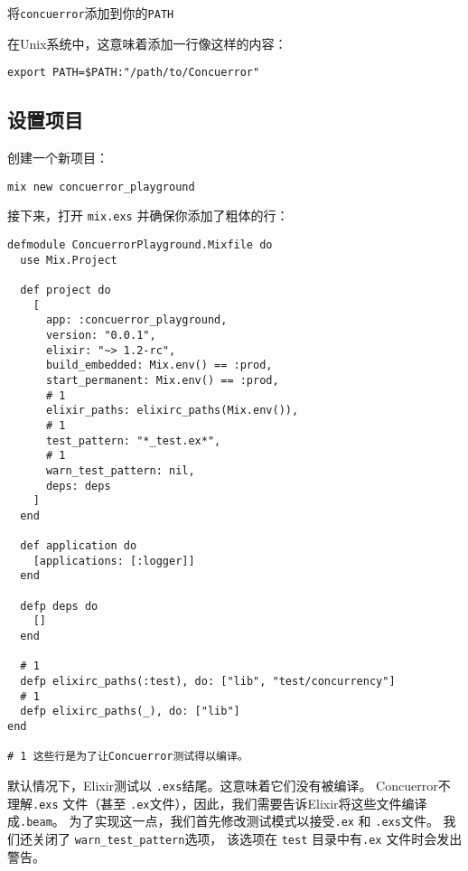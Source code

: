 将\texttt{concuerror}添加到你的\texttt{PATH}

在Unix系统中，这意味着添加一行像这样的内容：

\begin{code}{}
\begin{verbatim}
export PATH=$PATH:"/path/to/Concuerror"
\end{verbatim}
\end{code}

\subsection{设置项目}

创建一个新项目：

\begin{code}{}
\begin{verbatim}
mix new concuerror_playground
\end{verbatim}
\end{code}

接下来，打开 \texttt{mix.exs} 并确保你添加了粗体的行：

\begin{code}{}
\begin{verbatim}
defmodule ConcuerrorPlayground.Mixfile do
  use Mix.Project

  def project do
    [
      app: :concuerror_playground,
      version: "0.0.1",
      elixir: "~> 1.2-rc",
      build_embedded: Mix.env() == :prod,
      start_permanent: Mix.env() == :prod,
      # 1
      elixir_paths: elixirc_paths(Mix.env()),
      # 1
      test_pattern: "*_test.ex*",
      # 1
      warn_test_pattern: nil,
      deps: deps
    ]
  end

  def application do
    [applications: [:logger]]
  end

  defp deps do
    []
  end

  # 1
  defp elixirc_paths(:test), do: ["lib", "test/concurrency"]
  # 1
  defp elixirc_paths(_), do: ["lib"]
end

# 1 这些行是为了让Concuerror测试得以编译。
\end{verbatim}
\end{code}



默认情况下，Elixir测试以 \texttt{.exs}结尾。这意味着它们没有被编译。
Concuerror不理解\texttt{.exs} 文件（甚至 \texttt{.ex}文件），因此，我们需要告诉Elixir将这些文件编译成\texttt{.beam}。
为了实现这一点，我们首先修改测试模式以接受\texttt{.ex} 和 \texttt{.exs}文件。
我们还关闭了 \texttt{warn\_test\_pattern}选项，
该选项在 \texttt{test} 目录中有\texttt{.ex} 文件时会发出警告。

